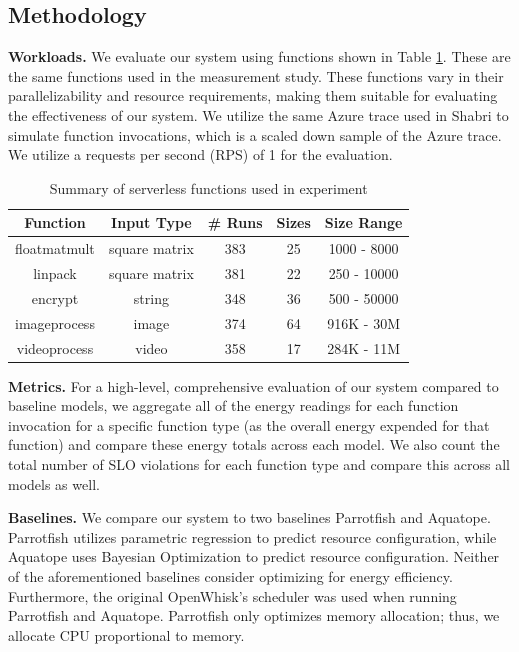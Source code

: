 \documentclass[times, 10pt,twocolumn]{article}
\begin{document}
\subsection{Methodology}
\textbf{Workloads.} We evaluate our system using functions shown in Table \ref{tab:summary_of_serverless_functions}. These are the same functions used in the measurement study. These functions vary in their parallelizability and resource requirements, making them suitable for evaluating the effectiveness of our system. We utilize the same Azure trace used in Shabri \cite{sinha2024shabari} to simulate function invocations, which is a scaled down sample of the Azure trace. We utilize a requests per second (RPS) of 1 for the evaluation.

\begin{table}[htbp]
  \centering
  \begin{tabular}{|c|c|c|c|c|}
  \hline
  \textbf{Function} & \textbf{Input Type} & \textbf{\# Runs} & \textbf{Sizes} & \textbf{Size Range} \\ \hline
  floatmatmult & square matrix & 383 & 25 & 1000 - 8000 \\ \hline
  linpack & square matrix & 381 & 22 & 250 - 10000 \\ \hline
  encrypt & string & 348 & 36 & 500 - 50000 \\ \hline
  imageprocess & image & 374 & 64 & 916K - 30M \\ \hline
  videoprocess & video & 358 & 17 & 284K - 11M \\ \hline
  \end{tabular}
  \caption{Summary of serverless functions used in experiment}
  \label{tab:summary_of_serverless_functions}
\end{table}

\textbf{Metrics.} For a high-level, comprehensive evaluation of our system compared to baseline models, we aggregate all of the energy readings for each function invocation for a specific function type (as the overall energy expended for that function) and compare these energy totals across each model. We also count the total number of SLO violations for each function type and compare this across all models as well.

\textbf{Baselines.} We compare our system to two baselines Parrotfish and Aquatope. Parrotfish \cite{parrotfish} utilizes parametric regression to predict resource configuration, while Aquatope \cite{aquatope} uses Bayesian Optimization to predict resource configuration. Neither of the aforementioned baselines consider optimizing for energy efficiency. Furthermore, the original OpenWhisk's scheduler was used when running Parrotfish and Aquatope. Parrotfish only optimizes memory allocation; thus, we allocate CPU proportional to memory. 
\end{document}
